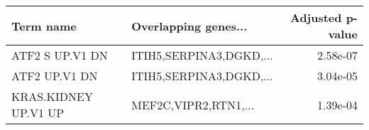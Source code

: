 \begin{tabular}{llr}
\toprule
           Term name &    Overlapping genes... &  Adjusted p-value \\
\midrule
     ATF2 S UP.V1 DN & ITIH5,SERPINA3,DGKD,... &          2.58e-07 \\
       ATF2 UP.V1 DN & ITIH5,SERPINA3,DGKD,... &          3.04e-05 \\
KRAS.KIDNEY UP.V1 UP &    MEF2C,VIPR2,RTN1,... &          1.39e-04 \\
\bottomrule
\end{tabular}
